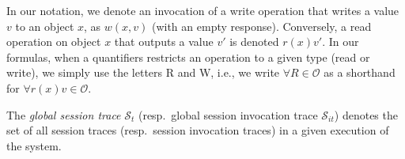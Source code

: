 \documentclass[acmlarge, ,11pt]{acmart}
\begin{document}
In our notation, we denote an invocation of a write operation that writes a value $v$ to an object $x$, as $w(x,v)$ (with an empty response). Conversely, a read operation on object $x$ that outputs a value $v'$ is denoted $r(x){v'}$. %
 \def\tuple#1{\langle #1\rangle}
In our formulas, when a quantifiers restricts an operation to a given type (read or write), we simply use the letters R and W, i.e., we write $\forall R \in \mathcal{O}$ as a shorthand for $\forall r(x){v} \in \mathcal{O}$.

The \emph{global session trace} $\mathcal{S}_t$ (resp.\ global session invocation trace $\mathcal{S}_{it}$) denotes the set of all
   session traces (resp.\ session invocation traces) in a given execution of the system.
\end{document}
